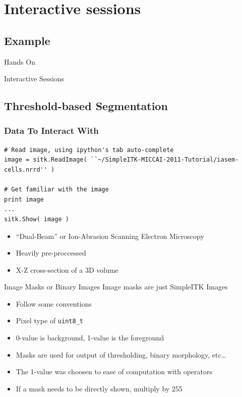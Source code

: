\section{Interactive sessions}

%
%

\subsection{Example}
\begin{frame}{Hands On}
\fontsize{36pt}{36pt}\selectfont
\center
\begin{center}
Interactive Sessions
\end{center}
\end{frame}

\subsection{Threshold-based Segmentation}

\begin{frame}[fragile]
\frametitle{Data To Interact With}
\lstpython
\begin{lstlisting}
# Read image, using ipython's tab auto-complete
image = sitk.ReadImage( ``~/SimpleITK-MICCAI-2011-Tutorial/iasem-cells.nrrd'' )

# Get familiar with the image
print image
...
sitk.Show( image )
\end{lstlisting}
\begin{itemize}
  \item ``Dual-Beam'' or Ion-Abrasion Scanning Electron Microscopy
  \item Heavily pre-proccessed
  \item  X-Z cross-section of a 3D volume
\end{itemize}
\end{frame}

\begin{frame}{Image Masks or Binary Images}
Image masks are just SimpleITK Images
\begin{itemize}
  \item Follow some conventions
  \item Pixel type of \texttt{uint8\_t}
  \item 0-value is background, 1-value is the foreground
  \item Masks are used for output of thresholding, binary morphology, etc\dots
  \item The 1-value was choosen to ease of computation with operators
  \item If a mask needs to be directly shown, multiply by 255
\end{itemize}
\end{frame}



